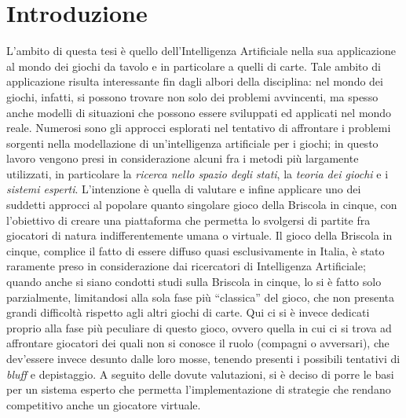 \chapter*{Introduzione}

\ifpdf
    \graphicspath{{Introduction/IntroductionFigs/PNG/}{Introduction/IntroductionFigs/PDF/}{Introduction/IntroductionFigs/}}
\else
    \graphicspath{{Introduction/IntroductionFigs/EPS/}{Introduction/IntroductionFigs/}}
\fi

L'ambito di questa tesi è quello dell'Intelligenza Artificiale nella sua applicazione al mondo dei giochi da tavolo e in particolare a quelli di carte. Tale ambito di applicazione risulta interessante fin dagli albori della disciplina: nel mondo dei giochi, infatti, si possono trovare non solo dei problemi avvincenti, ma spesso anche modelli di situazioni che possono essere sviluppati ed applicati nel mondo reale.
Numerosi sono gli approcci esplorati nel tentativo di affrontare i problemi sorgenti nella modellazione di un'intelligenza artificiale per i giochi; in questo lavoro vengono presi in considerazione alcuni fra i metodi più largamente utilizzati, in particolare la \emph{ricerca nello spazio degli stati}, la \emph{teoria dei giochi} e i \emph{sistemi esperti}.
L'intenzione è quella di valutare e infine applicare uno dei suddetti approcci al popolare quanto singolare gioco della Briscola in cinque, con l'obiettivo di creare una piattaforma che permetta lo svolgersi di partite fra giocatori di natura indifferentemente umana o virtuale.
Il gioco della Briscola in cinque, complice il fatto di essere diffuso quasi esclusivamente in Italia, è stato raramente preso in considerazione dai ricercatori di Intelligenza Artificiale; quando anche si siano condotti studi sulla Briscola in cinque, lo si è fatto solo parzialmente, limitandosi alla sola fase più ``classica'' del gioco, che non presenta grandi difficoltà rispetto agli altri giochi di carte.
Qui ci si è invece dedicati proprio alla fase più peculiare di questo gioco, ovvero quella in cui ci si trova ad affrontare giocatori dei quali non si conosce il ruolo (compagni o avversari), che dev'essere invece desunto dalle loro mosse, tenendo presenti i possibili tentativi di \emph{bluff} e depistaggio.
A seguito delle dovute valutazioni, si è deciso di porre le basi per un sistema esperto che permetta l'implementazione di strategie che rendano competitivo anche un giocatore virtuale.



